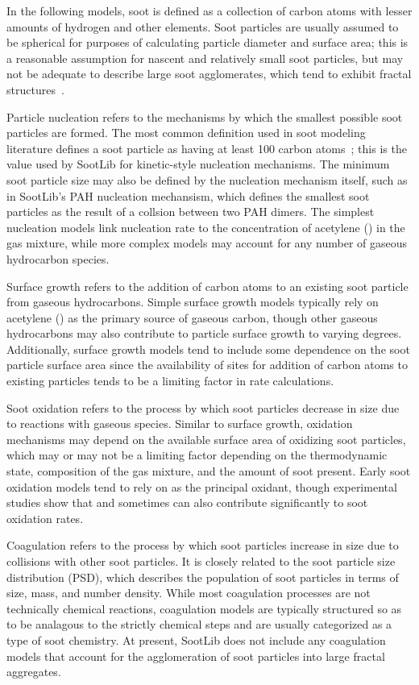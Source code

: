 \documentclass[preprint,12pt,letterpaper]{elsarticle}
\begin{document}
In the following models, soot is defined as a collection of carbon atoms with lesser amounts of hydrogen and other elements. Soot particles are usually assumed to be spherical for purposes of calculating particle diameter and surface area; this is a reasonable assumption for nascent and relatively small soot particles, but may not be adequate to describe large soot agglomerates, which tend to exhibit fractal structures~\cite{Fuchs_1964}.

Particle nucleation refers to the mechanisms by which the smallest possible soot particles are formed. The most common definition used in soot modeling literature defines a soot particle as having at least 100 carbon atoms~\cite{Leung_1991}; this is the value used by SootLib for kinetic-style nucleation mechanisms. The minimum soot particle size may also be defined by the nucleation mechanism itself, such as in SootLib's PAH nucleation mechansism, which defines the smallest soot particles as the result of a collsion between two PAH dimers. The simplest nucleation models link nucleation rate to the concentration of acetylene () in the gas mixture, while more complex models may account for any number of gaseous hydrocarbon species.

Surface growth refers to the addition of carbon atoms to an existing soot particle from gaseous hydrocarbons. Simple surface growth models typically rely on acetylene () as the primary source of gaseous carbon, though other gaseous hydrocarbons may also contribute to particle surface growth to varying degrees. Additionally, surface growth models tend to include some dependence on the soot particle surface area since the availability of sites for addition of carbon atoms to existing particles tends to be a limiting factor in rate calculations.

Soot oxidation refers to the process by which soot particles decrease in size due to reactions with gaseous species. Similar to surface growth, oxidation mechanisms may depend on the available surface area of oxidizing soot particles, which may or may not be a limiting factor depending on the thermodynamic state, composition of the gas mixture, and the amount of soot present. Early soot oxidation models tend to rely on  as the principal oxidant, though experimental studies show that  and sometimes  can also contribute significantly to soot oxidation rates.

Coagulation refers to the process by which soot particles increase in size due to collisions with other soot particles. It is closely related to the soot particle size distribution (PSD), which describes the population of soot particles in terms of size, mass, and number density. While most coagulation processes are not technically chemical reactions, coagulation models are typically structured so as to be analagous to the strictly chemical steps and are usually categorized as a type of soot chemistry. At present, SootLib does not include any coagulation models that account for the agglomeration of soot particles into large fractal aggregates.
\end{document}

